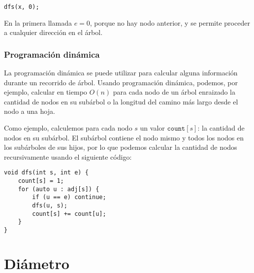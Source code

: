 \begin{lstlisting}
dfs(x, 0);
\end{lstlisting}

En la primera llamada $e=0$, porque no hay
nodo anterior, y se permite
proceder a cualquier dirección en el árbol.

\subsubsection{Programación dinámica}

La programación dinámica se puede utilizar para calcular
alguna información durante un recorrido de árbol.
Usando programación dinámica, podemos, por ejemplo,
calcular en tiempo $O(n)$ para cada nodo de un árbol enraizado
la cantidad de nodos en su subárbol
o la longitud del camino más largo desde el nodo
a una hoja.

Como ejemplo, calculemos para cada nodo $s$
un valor $\texttt{count}[s]$: la cantidad de nodos en su subárbol.
El subárbol contiene el nodo mismo y
todos los nodos en los subárboles de sus hijos,
por lo que podemos calcular la cantidad de nodos
recursivamente usando el siguiente código:

\begin{lstlisting}
void dfs(int s, int e) {
    count[s] = 1;
    for (auto u : adj[s]) {
        if (u == e) continue;
        dfs(u, s);
        count[s] += count[u];
    }
}
\end{lstlisting}

\section{Diámetro}


